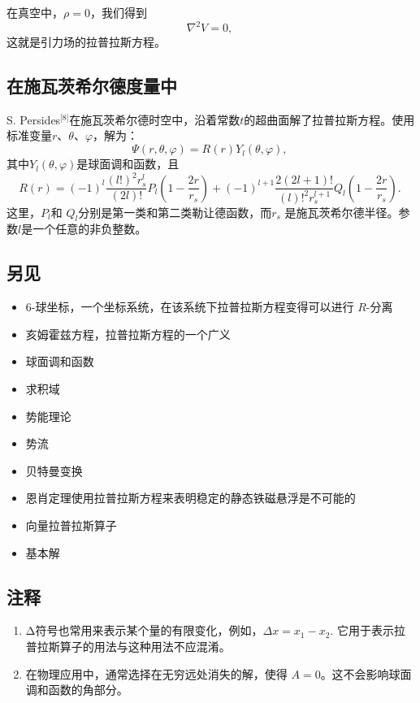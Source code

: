 在真空中，\( \rho = 0 \)，我们得到
\[
\nabla^2 V = 0,~
\]
这就是引力场的拉普拉斯方程。
\subsection{在施瓦茨希尔德度量中}  
S. Persides\(^\text{[8]}\)在施瓦茨希尔德时空中，沿着常数\( t \)的超曲面解了拉普拉斯方程。使用标准变量\( r \)、\( \theta \)、\( \varphi \)，解为：
\[
\Psi (r, \theta, \varphi) = R(r) Y_l(\theta, \varphi),~
\]
其中\( Y_l(\theta, \varphi) \)是球面调和函数，且
\[
R(r) = (-1)^l \frac{(l!)^2 r_s^l}{(2l)!} P_l \left( 1 - \frac{2r}{r_s} \right) + (-1)^{l+1} \frac{2(2l+1)!}{(l)!^2 r_s^{l+1}} Q_l \left( 1 - \frac{2r}{r_s} \right).~
\]
这里，\( P_l \)和 \( Q_l \)分别是第一类和第二类勒让德函数，而\( r_s \) 是施瓦茨希尔德半径。参数\( l \)是一个任意的非负整数。
\subsection{另见}  
\begin{itemize}
\item 6-球坐标，一个坐标系统，在该系统下拉普拉斯方程变得可以进行 \( R \)-分离  
\item 亥姆霍兹方程，拉普拉斯方程的一个广义  
\item 球面调和函数  
\item 求积域  
\item 势能理论  
\item 势流  
\item 贝特曼变换  
\item 恩肖定理使用拉普拉斯方程来表明稳定的静态铁磁悬浮是不可能的  
\item 向量拉普拉斯算子  
\item 基本解 
\end{itemize} 
\subsection{注释}  
\begin{enumerate}
\item Δ符号也常用来表示某个量的有限变化，例如，\(\Delta x = x_1 - x_2\). 它用于表示拉普拉斯算子的用法与这种用法不应混淆。  
\item 在物理应用中，通常选择在无穷远处消失的解，使得 \( A = 0 \)。这不会影响球面调和函数的角部分。
\end{enumerate}
